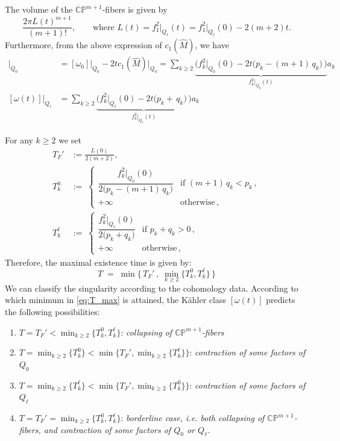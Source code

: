 \documentclass[11pt]{amsart}
\theoremstyle{plain}
\numberwithin{equation}{section}
\theoremstyle{definition}
\theoremstyle{remark}
\begin{document}
The volume of the $\mathbb{CP}^{m+1}$-fibers is given by 
\[\frac{2\pi L(t)^{m+1}}{(m+1)!}, \qquad \text{where } L(t) = f_1^2\big|_{Q_\ell}(t) = f_1^2\big|_{Q_\ell}(0) - 2(m+2)t.\]
Furthermore, from the above expression of $c_1(\widehat{M})$, we have
\begin{align*}
[\omega(t)]\big|_{Q_0} & = [\omega_0]\big|_{Q_0} - 2tc_1(\widehat{M})\big|_{Q_0} = \sum_{k \geq 2}\underbrace{\Big(f_k^2|_{Q_0}(0) - 2t\big( p_k - (m+1)\, q_k \big)\,\Big)}_{f_k^2|_{Q_0}(t)} a_k\\
[\omega(t)]\big|_{Q_\ell} & = \sum_{k \geq 2}\underbrace{\Big(f_k^2|_{Q_\ell}(0) - 2t\big( p_k +\, q_k \big)\,\Big)}_{f_k^2|_{Q_\ell}(t)}a_k
\end{align*}


For any $k \geq 2$ we set
\begin{align*}
T_F' & := \frac{L(0)}{2(m+2)},\\
T_k^0 & :=\; \begin{cases} \dfrac{f_k^2 |_{Q_0} (0)}{2 \big( p_k - ( m + 1 )\, q_k \big)} & \text{if } ( m + 1 )\, q_k < p_k \,, \\[4pt] + \infty & \text{otherwise} \,, \end{cases}\\
T_k^\ell & :=\; \begin{cases} \dfrac{f_k^2 |_{Q_\ell} (0)}{2 \big( p_k + q_k \big)} & \text{if } p_k + q_k > 0 \,, \\[4pt] + \infty & \text{otherwise} \,, \end{cases}
\end{align*}
Therefore, the maximal existence time is given by:
\begin{equation}\label{eq:T_max}
T \;=\; \min \Big\{\, T_F' \,, \; \min_{k \geq 2} \{T_k^0, T_k^\ell\} \,\Big\}
\end{equation}
We can classify the singularity according to the cohomology data. According to which minimum in \eqref{eq:T_max} is attained, the K\"ahler class $[\omega(t)]$ predicts the following possibilities:
\begin{enumerate}
\item $T = T_F' < \min_{k\geq 2}\{T_k^0, T_k^\ell\}$: \emph{collapsing of $\mathbb{CP}^{m+1}$-fibers}
\item $T = \min_{k \geq 2}\{T_k^0\} < \min\big\{T_F', \min_{k\geq 2}\{T_k^\ell\}\big\}$: \emph{contraction of some factors of $Q_0$}
\item $T = \min_{k \geq 2}\{T_k^\ell\} < \min\big\{T_F', \min_{k\geq 2}\{T_k^0\}\big\}$: \emph{contraction of some factors of $Q_\ell$}
\item $T = T_F' = \min_{k \geq 2}\big\{T_k^0,T_k^\ell\big\}$: \emph{borderline case, i.e. both collapsing of $\mathbb{CP}^{m+1}$-fibers, and contraction of some factors of $Q_0$ or $Q_\ell$.}
\end{enumerate}
\end{document}
